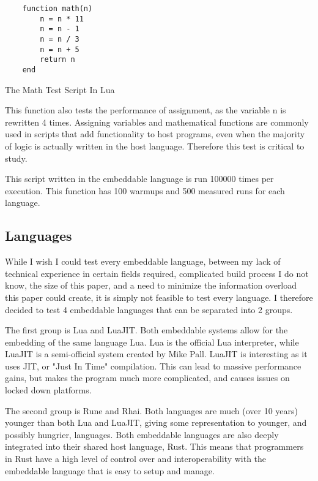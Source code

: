 \begin{listing}[H]
    \begin{verbatim}
    function math(n)
        n = n * 11
        n = n - 1
        n = n / 3
        n = n + 5
        return n
    end
    \end{verbatim}
    \caption{The Math Test Script In Lua}
    \label{lst:lua-math}
\end{listing}

This function also tests the performance of assignment, as the variable n is rewritten 4 times. Assigning variables and mathematical functions are commonly used in scripts that add functionality to host programs, even when the majority of logic is actually written in the host language. Therefore this test is critical to study.

This script written in the embeddable language is run 100000 times per execution. This function has 100 warmups and 500 measured runs for each language.

\subsection{Languages}
While I wish I could test every embeddable language, between my lack of technical experience in certain fields required, complicated build process I do not know, the size of this paper, and a need to minimize the information overload this paper could create, it is simply not feasible to test every language. I therefore decided to test 4 embeddable languages that can be separated into 2 groups.

The first group is Lua\cite{lua} and LuaJIT\cite{luaJIT}. Both embeddable systems allow for the embedding of the same language Lua. Lua is the official Lua interpreter, while LuaJIT is a semi-official system created by Mike Pall. LuaJIT is interesting as it uses JIT, or "Just In Time" compilation. This can lead to massive performance gains, but makes the program much more complicated, and causes issues on locked down platforms.

The second group is Rune\cite{rune} and Rhai\cite{rhai}. Both languages are much (over 10 years) younger than both Lua and LuaJIT, giving some representation to younger, and possibly hungrier, languages. Both embeddable languages are also deeply integrated into their shared host language, Rust. This means that programmers in Rust have a high level of control over and interoperability with the embeddable language that is easy to setup and manage.

